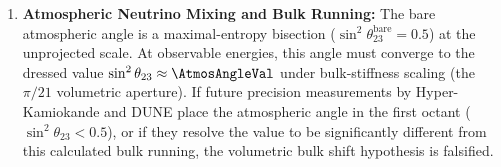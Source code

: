 \begin{enumerate}
    \item \textbf{Atmospheric Neutrino Mixing and Bulk Running:} The bare atmospheric angle is a maximal-entropy bisection ($\sin^2\theta_{23}^{\text{bare}} = 0.5$) at the unprojected scale. At observable energies, this angle must converge to the dressed value $\sin^2\theta_{23} \approx \mathbf{\AtmosAngleVal}$ under bulk-stiffness scaling (the $\pi/21$ volumetric aperture). If future precision measurements by Hyper-Kamiokande and DUNE place the atmospheric angle in the first octant ($\sin^2\theta_{23} < 0.5$), or if they resolve the value to be significantly different from this calculated bulk running, the volumetric bulk shift hypothesis is falsified.
\end{enumerate}
